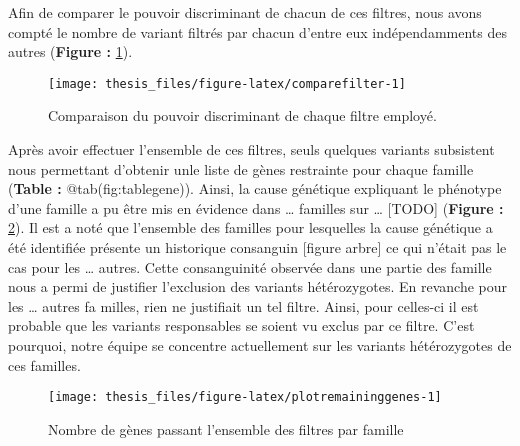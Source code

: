 \documentclass[12pt,twoside]{reedthesis}
\theoremstyle{definition}
\theoremstyle{definition}
\theoremstyle{remark}
\begin{document}
  Afin de comparer le pouvoir discriminant de chacun de ces filtres, nous
  avons compté le nombre de variant filtrés par chacun d'entre eux
  indépendamments des autres (\textbf{Figure : }\ref{fig:comparefilter}).
  
  \begin{figure}
  
  {\centering \texttt{[image: thesis\_files/figure-latex/comparefilter-1]} 
  
  }
  
  \caption[Comparaison du pouvoir discriminant de chaque filtre employé.]{Comparaison du pouvoir discriminant de chaque filtre employé.}\label{fig:comparefilter}
  \end{figure}
  
  Après avoir effectuer l'ensemble de ces filtres, seuls quelques variants
  subsistent nous permettant d'obtenir unle liste de gènes restrainte pour
  chaque famille (\textbf{Table : }@tab(fig:tablegene)). Ainsi, la cause
  génétique expliquant le phénotype d'une famille a pu être mis en
  évidence dans \ldots{} familles sur \ldots{} {[}TODO{]} (\textbf{Figure
  : }\ref{fig:plotremaininggenes}). Il est a noté que l'ensemble des
  familles pour lesquelles la cause génétique a été identifiée présente un
  historique consanguin {[}figure arbre{]} ce qui n'était pas le cas pour
  les \ldots{} autres. Cette consanguinité observée dans une partie des
  famille nous a permi de justifier l'exclusion des variants
  hétérozygotes. En revanche pour les \ldots{} autres fa milles, rien ne
  justifiait un tel filtre. Ainsi, pour celles-ci il est probable que les
  variants responsables se soient vu exclus par ce filtre. C'est pourquoi,
  notre équipe se concentre actuellement sur les variants hétérozygotes de
  ces familles.
  
  \begin{figure}
  
  {\centering \texttt{[image: thesis\_files/figure-latex/plotremaininggenes-1]} 
  
  }
  
  \caption[Nombre de gènes passant l'ensemble des filtres par famille]{Nombre de gènes passant l'ensemble des filtres par famille}\label{fig:plotremaininggenes}
  \end{figure}
  
\end{document}
